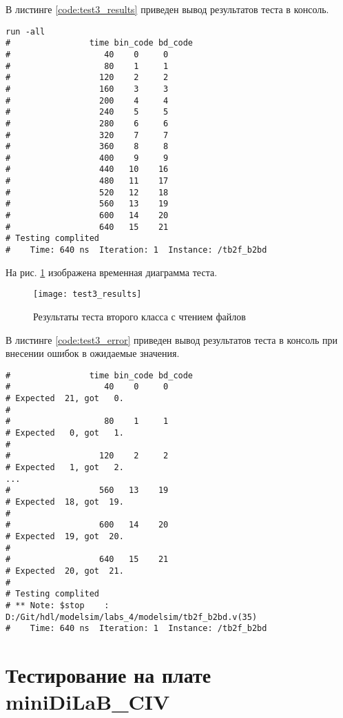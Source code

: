 В листинге \ref{code:test3_results} приведен вывод результатов теста в консоль.
\begin{lstlisting}[caption=Результаты теста второго класса с чтением файлов, label=code:test3_results, style=console]
run -all
# 		         time bin_code bd_code
#                   40    0     0
#                   80    1     1
#                  120    2     2
#                  160    3     3
#                  200    4     4
#                  240    5     5
#                  280    6     6
#                  320    7     7
#                  360    8     8
#                  400    9     9
#                  440   10    16
#                  480   11    17
#                  520   12    18
#                  560   13    19
#                  600   14    20
#                  640   15    21
# Testing complited
#    Time: 640 ns  Iteration: 1  Instance: /tb2f_b2bd
\end{lstlisting}

На рис. \ref{fig:test3_results} изображена временная диаграмма теста.
\begin{figure}[H]
	\begin{center}
		\texttt{[image: test3\_results]}
		\caption{Результаты теста второго класса с чтением файлов}
		\label{fig:test3_results}
	\end{center}
\end{figure}

В листинге \ref{code:test3_error} приведен вывод результатов теста в консоль при внесении ошибок в ожидаемые значения.
\begin{lstlisting}[caption=Результаты ошибочного теста второго класса с чтением файлов, label=code:test3_error, style=console]
# 		         time bin_code bd_code
#                   40    0     0
# Expected  21, got   0.
# 
#                   80    1     1
# Expected   0, got   1.
# 
#                  120    2     2
# Expected   1, got   2.
...
#                  560   13    19
# Expected  18, got  19.
# 
#                  600   14    20
# Expected  19, got  20.
# 
#                  640   15    21
# Expected  20, got  21.
# 
# Testing complited
# ** Note: $stop    : D:/Git/hdl/modelsim/labs_4/modelsim/tb2f_b2bd.v(35)
#    Time: 640 ns  Iteration: 1  Instance: /tb2f_b2bd
\end{lstlisting}

\section{Тестирование на плате miniDiLaB\_CIV}

